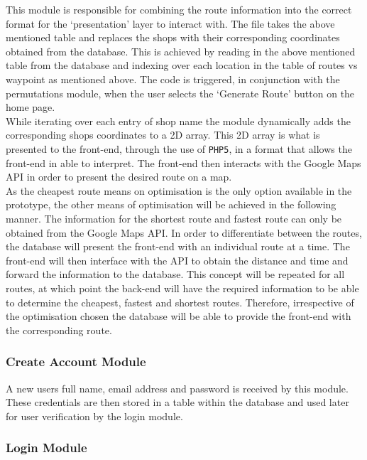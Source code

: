 \documentclass[10pt,twocolumn]{witseiepaper}
\begin{document}
		This module is responsible for combining the route information into the correct format for the `presentation' layer to interact with. The file takes the above mentioned table and replaces the shops with their corresponding coordinates obtained from the database. This is achieved by reading in the above mentioned table from the database and indexing over each location in the table of routes vs waypoint as mentioned above. The code is triggered, in conjunction with the permutations module, when the user selects the `Generate Route' button on the home page. \\
		
		While iterating over each entry of shop name the module dynamically adds the corresponding shops coordinates to a 2D array. This 2D array is what is presented to the front-end, through the use of \texttt{PHP5}, in a format that allows the front-end in able to interpret. The front-end then interacts with the Google Maps API in order to present the desired route on a map.\\
		
		As the cheapest route means on optimisation is the only option available in the prototype, the other means of optimisation will be achieved in the following manner. The information for the shortest route and fastest route can only be obtained from the Google Maps API. In order to differentiate between the routes, the database will present the front-end with an individual route at a time. The front-end will then interface with the API to obtain the distance and time and forward the information to the database. This concept will be repeated for all routes, at which point the back-end will have the required information to be able to determine the cheapest, fastest and shortest routes. Therefore, irrespective of the optimisation chosen the database will be able to provide the front-end with the corresponding route.
		
		\subsubsection{Create Account Module}
		
		A new users full name, email address and password is received by this module. These credentials are then stored in a table within the database and used later for user verification by the login module.
		
		\subsubsection{Login Module}
		
\end{document}
